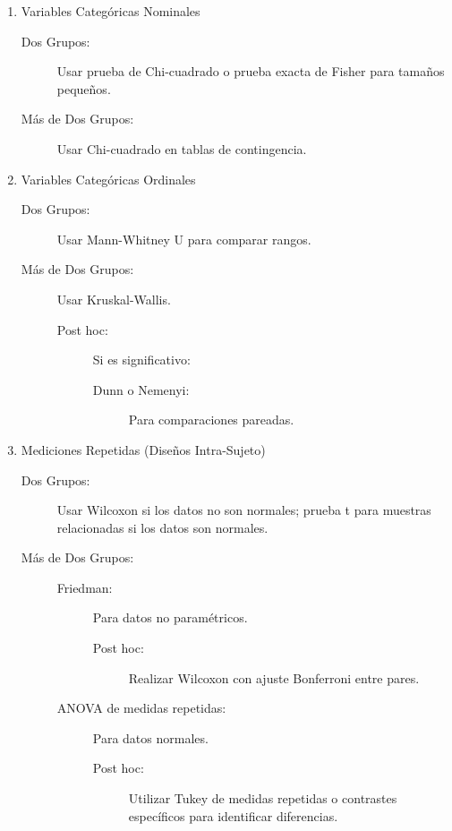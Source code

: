 \documentclass[12pt,letterpaper,spanish, twoside]{article}
\begin{document}
\begin{enumerate}
    \item Variables Categóricas Nominales
    \begin{description}
        \item[Dos Grupos:] Usar prueba de Chi-cuadrado o prueba exacta de Fisher para tamaños pequeños.
        \item[Más de Dos Grupos:] Usar Chi-cuadrado en tablas de contingencia.
    \end{description}

    \item Variables Categóricas Ordinales
    \begin{description}
        \item[Dos Grupos:] Usar Mann-Whitney U para comparar rangos.
        \item[Más de Dos Grupos:] Usar Kruskal-Wallis.
            \begin{description}
                \item[Post hoc:] Si es significativo:
                    \begin{description}
                        \item[Dunn o Nemenyi:] Para comparaciones pareadas.
                    \end{description}
            \end{description}
    \end{description}

    \item Mediciones Repetidas (Diseños Intra-Sujeto)
    \begin{description}
        \item[Dos Grupos:] Usar Wilcoxon si los datos no son normales; prueba t para muestras relacionadas si los datos son normales.
        \item[Más de Dos Grupos:]
            \begin{description}
                \item[Friedman:] Para datos no paramétricos.
                    \begin{description}
                        \item[Post hoc:] Realizar Wilcoxon con ajuste Bonferroni entre pares.
                    \end{description}
                \item[ANOVA de medidas repetidas:] Para datos normales.
                    \begin{description}
                        \item[Post hoc:] Utilizar Tukey de medidas repetidas o contrastes específicos para identificar diferencias.
                    \end{description}
            \end{description}
    \end{description}


\end{enumerate}
\end{document}
